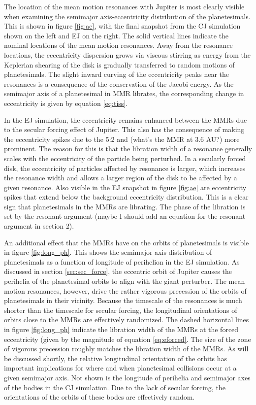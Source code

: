\documentclass[twocolumn]{aastex63}
\begin{document}
The location of the mean motion resonances with Jupiter is most clearly visible when examining the semimajor axis-eccentricity 
distribution of the planetesimals. This is shown in figure \ref{fig:ae}, with the final snapshot from the CJ simulation shown on the left 
and EJ on the right. The solid vertical lines indicate the nominal locations of the mean motion resonances. Away from the resonance 
locations, the eccentricity dispersion grows via viscous stirring as energy from the Keplerian shearing of the disk is gradually 
transferred to random motions of planetesimals. The slight inward curving of the eccentricity peaks near the resonances is a 
consequence of the conservation of the Jacobi energy. As the semimajor axis of a planetesimal in MMR librates, the corresponding 
change in eccentricity is given by equation \ref{eq:tiss}.

In the EJ simulation, the eccentricity remains enhanced between the MMRs due to the secular forcing effect of Jupiter. This also has 
the consequence of making the eccentricity spikes due to the 5:2 and (what's the MMR at 3.6 AU?) more prominent. The reason for 
this is that the libration width of a resonance generally scales with the eccentricity of the particle being perturbed. In a secularly 
forced disk, the eccentricity of particles affected by resonance is larger, which increases the resonance width and allows a larger 
region of the disk to be affected by a given resonance. Also visible in the EJ snapshot in figure \ref{fig:ae} are eccentricity spikes that 
extend below the background eccentricity distribution. This is a clear sign that planetesimals in the MMRs are librating. The phase of 
the libration is set by the resonant argument (maybe I should add an equation for the resonant argument in section 2).

An additional effect that the MMRs have on the orbits of planetesimals is visible in figure \ref{fig:long_ph}. This shows the semimajor 
axis distribution of planetesimals as a function of longitude of perihelion in the EJ simulation. As discussed in section 
\ref{sec:sec_force}, the eccentric orbit of Jupiter causes the perihelia of the planetesimal orbits to align with the giant perturber. The 
mean motion resonances, however, drive the rather vigorous precession of the orbits of planetesimals in their vicinity. Because the 
timescale of the resonances is much shorter than the timescale for secular forcing, the longitudinal orientations of orbits close to the 
MMRs are effectively randomized. The dashed horizontal lines in figure \ref{fig:long_ph} indicate the libration width of the MMRs at 
the forced eccentricity (given by the magnitude of equation \ref{eq:eforced}. The size of the zone of vigorous precession roughly 
matches the libration width of the MMRs. As will be discussed shortly, the relative longitudinal orientation of the orbits has important 
implications for where and when planetesimal collisions occur at a given semimajor axis. Not shown is the longitude of perihelia and 
semimajor axes of the bodies in the CJ simulation. Due to the lack of secular forcing, the orientations of the orbits of these bodes are 
effectively random.
\end{document}
